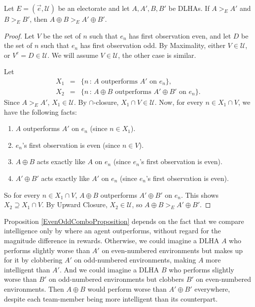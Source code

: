 \documentclass[twoside,11pt]{article}
\begin{document}
\begin{proposition}
\label{EvenOddComboProposition}
Let $E=(\vec{e},\mathscr U)$ be an electorate
and let $A,A',B,B'$ be DLHAs.
If $A>_{E}A'$ and $B>_{E}B'$,
then $A\oplus B >_{E} A'\oplus B'$.
\end{proposition}

\begin{proof}
Let $V$ be the set of $n$ such that $e_n$ has first observation even, and let
$D$ be the set of $n$ such that $e_n$ has first observation odd.
By Maximality, either $V\in\mathscr U$, or $V^c=D\in\mathscr U$. We will assume
$V\in\mathscr U$, the other case is similar.

Let
\begin{eqnarray*}
    X_1 &=& \{n\,:\,\mbox{$A$ outperforms $A'$ on $e_n$}\},\\
    X_2 &=& \{n\,:\,\mbox{$A\oplus B$ outperforms $A'\oplus B'$ on $e_n$}\}.
\end{eqnarray*}
Since $A>_{E}A'$, $X_1\in\mathscr U$. By $\cap$-closure, $X_1\cap V\in\mathscr U$.
Now, for every $n\in X_1\cap V$, we have the following facts:
\begin{enumerate}
    \item
    $A$ outperforms $A'$ on $e_n$ (since $n\in X_1$).
    \item
    $e_n$'s first observation is even (since $n\in V$).
    \item
    $A\oplus B$ acts exactly like $A$ on $e_n$ (since $e_n$'s first observation is even).
    \item
    $A'\oplus B'$ acts exactly like $A'$ on $e_n$ (since $e_n$'s first observation is even).
\end{enumerate}
So for every $n\in X_1\cap V$, $A\oplus B$ outperforms $A'\oplus B'$ on $e_n$.
This shows $X_2\supseteq X_1\cap V$.
By Upward Closure, $X_2\in\mathscr U$, so $A\oplus B >_{E} A'\oplus B'$.
\end{proof}

Proposition \ref{EvenOddComboProposition} depends on the fact that we
compare intelligence only by where an agent outperforms,
without regard for the magnitude difference in rewards.
Otherwise, we could imagine a DLHA $A$ who performs slightly worse than $A'$
on even-numbered environments but makes up for it by clobbering $A'$ on
odd-numbered environments, making $A$ more intelligent than $A'$.
And we could imagine a DLHA $B$ who performs slightly worse than $B'$ on
odd-numbered environments but clobbers $B'$ on even-numbered environments.
Then $A\oplus B$ would perform worse than $A'\oplus B'$ everywhere, despite
each team-member being more intelligent than its counterpart.
\end{document}
